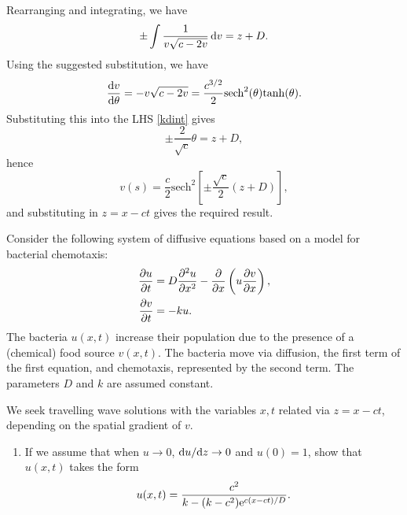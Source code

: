 \documentclass[a4paper, 12pt]{article}
\begin{document}
\begin{enumerate}[label={\bf \arabic{*}.\;}, ref={\arabic{*}},itemsep=3ex, left=0ex]
{\begin{enumerate}[label=(\alph*)]
{            Rearranging and integrating, we have
            \begin{equation}
              \label{kdint}
              \pm\int\frac{1}{v\sqrt{c-2v}}\,{\mathrm d} v = z+D.
            \end{equation}
            Using the suggested substitution, we have
            \begin{align}
              \fd{v}{\theta} = -
              v\sqrt{c-2v} = \frac{c^{3/2}}{2}\mathrm{sech}^2(\theta)\mathrm{tanh}(\theta).
            \end{align}
            Substituting this into the LHS \cref{kdint} gives
            \begin{equation}
              \pm \frac{2}{\sqrt{c}}\theta = z +D,
            \end{equation}
            hence
            \begin{equation}
              v(s) = \frac{c}{2}\mathrm{sech}^2\left[\pm \frac{\sqrt{c}}{2}(z + D)\right],
            \end{equation}
            and substituting in $z=x-ct$ gives the required result.
          }
      \end{enumerate}

    }


    {
      Consider the following system of diffusive equations based on a model for bacterial chemotaxis:
      \begin{align}
        \pd{u}{t} &= D\pdd{u}{x} - \pd{}{x}\left(u\pd{v}{x}\right),\\
        \pd{v}{t} &= -k u.
      \end{align}
      The bacteria $u(x,t)$ increase their population due to the presence of a (chemical) food source $v(x,t)$. The bacteria move via diffusion, the first term of the first equation, and chemotaxis, represented by the second term.  The parameters $D$ and $k$ are assumed constant.

      We seek travelling wave solutions with the variables $x,t$ related via $z=x-ct$, depending on the spatial gradient of $v$.
      \begin{enumerate}[label=(\alph*)]
        \item If we assume that when $u\to 0$, $\fd{u}{z}\to 0$ and $u(0)=1$, show that $u(x,t)$ takes the form
          \begin{equation}
            u(x,t) = \frac{c^2}{k-(k-c^2)\mathrm{e} ^{c(x-ct)/D}}.
          \end{equation}


\end{enumerate}}
\end{enumerate}
\end{document}
